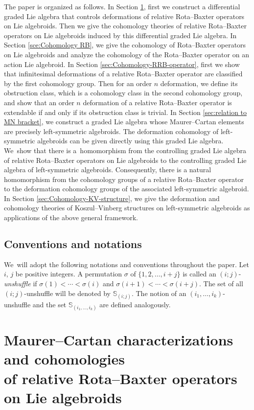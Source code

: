 \documentclass[10pt,a4paper]{amsart}
\numberwithin{equation}{section}
\begin{document}
The paper is organized as follows.
In Section \ref{sec:MC-RRB-operator}, first we construct a differential graded Lie algebra that controls deformations of relative Rota--Baxter operators on Lie algebroids. Then we give the cohomology theories of relative Rota--Baxter operators on Lie algebroids induced by this differential graded Lie algebra. In Section \ref{sce:Cohomology RB}, we give the cohomology of Rota--Baxter operators on Lie algebroids and analyze the cohomology of the Rota--Baxter operator on an action Lie algebroid. In Section \ref{sec:Cohomology-RRB-operator}, first we show that infinitesimal deformations of a relative Rota--Baxter operator are classified by the first cohomology group. Then for an order $n$ deformation, we define its obstruction class, which is a cohomology class in the second cohomology group, and show that an order $n$ deformation of a relative Rota--Baxter operator is extendable if and only if its obstruction class is trivial.
In Section \ref{sec:relation to MN bracket}, we construct a graded Lie algebra whose Maurer--Cartan elements are precisely left-symmetric algebroids. The deformation cohomology of left-symmetric algebroids can be given directly using this graded Lie algebra. We~show that there is a~homomorphism from the controlling graded Lie algebra of relative Rota--Baxter operators on Lie algebroids to the controlling graded Lie algebra of left-symmetric algebroids. Consequently, there is a natural homomorphism from the cohomology groups of a relative Rota--Baxter operator to the deformation cohomology groups of the associated left-symmetric algebroid.
In Section \ref{sec:Cohomology-KV-structure}, we give the deformation and cohomology theories of Koszul--Vinberg structures on left-symmetric algebroids as applications of the above general framework.

\subsection{Conventions and notations}
We~will adopt the following notations and conventions throughout the paper.
Let $i$, $j$ be positive integers. A permutation $\sigma$ of $\{1,2,\dots,i+j\}$ is called an $(i;j)$-{\it unshuffle} if $\sigma(1)<\cdots<\sigma(i)$ and $\sigma(i+1)<\cdots<\sigma(i+j)$. The set of all $(i;j)$-unshuffle will be denoted by $\mathbb{S}_{(i;j)}$. The notion of an $(i_1,\dots,i_k)$-unshuffle and the set $\mathbb{S}_{(i_1,\dots,i_k)}$ are defined analogously.

\section[Maurer--Cartan characterizations and cohomologies of relative Rota--Baxter operators on Lie algebroids]
{Maurer--Cartan characterizations and cohomologies \\of relative Rota--Baxter operators on Lie algebroids}\label{sec:MC-RRB-operator}
\end{document}
